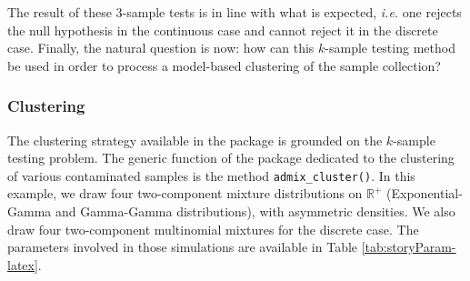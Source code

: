 The result of these 3-sample tests is in line with what is expected, \emph{i.e.} one rejects the null hypothesis in the continuous case and cannot reject it in the discrete case.
Finally, the natural question is now: how can this \(k\)-sample testing method be used in order to process a model-based clustering of the sample collection?

\subsubsection{Clustering}\label{clustering-1}

The clustering strategy available in the package  is grounded on the \(k\)-sample testing problem. The generic function of the package dedicated to the clustering of various contaminated samples is the method \texttt{admix\_cluster()}. In this example, we draw four two-component mixture distributions on \(\mathbb{R}^+\) (Exponential-Gamma and Gamma-Gamma distributions), with asymmetric densities. We also draw four two-component multinomial mixtures for the discrete case. The parameters involved in those simulations are available in Table \ref{tab:storyParam-latex}.

\begin{table}[!h]
\centering
\caption{\label{tab:storyParam-latex}Parameters used for simulations (pop1 to pop4 for mixtures of continuous random variables, and pop5 to pop8 in the discrete case), with Gamma, Exponential, and Multinomial distributions.}
\centering
{}
\end{table}

